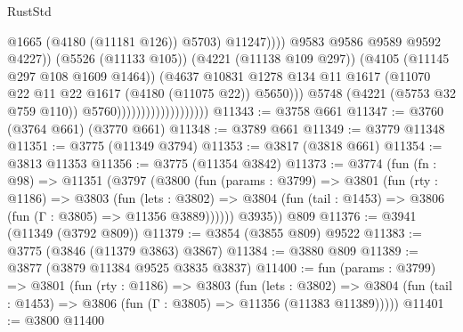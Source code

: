 \begin{lexlean}{RustStd}
\begin{coremodule}
{\begin{coremodule}
{{{{{{{{{{{{{{{{{{{{{{{{{{{{{{{                                                          @1665
                                                          (@4180 (@11181 @126))
                                                          @5703)
                                                        @11247))))
                                                @9583
                                                @9586
                                                @9589
                                                @9592
                                                @4227))
                                            (@5526 (@11133 @105))
                                            (@4221 (@11138 @109 @297))
                                            (@4105 (@11145 @297 @108 @1609 @1464))
                                            (@4637
                                              @10831
                                              @1278
                                              @134
                                              @11
                                              @1617
                                              (@11070
                                                @22
                                                @11
                                                @22
                                                @1617
                                                (@4180 (@11075 @22))
                                                @5650)))
                                          @5748
                                          (@4221 (@5753 @32 @759 @110))
                                          @5760)))))))))))))))))))
@11343 := @3758 @661
@11347 := @3760 (@3764 @661) (@3770 @661)
@11348 := @3789 @661
@11349 := @3779 @11348
@11351 := @3775 (@11349 @3794)
@11353 := @3817 (@3818 @661)
@11354 := @3813 @11353
@11356 := @3775 (@11354 @3842)
@11373 := @3774
    (fun (fn : @98) =>
    @11351
      (@3797
        (@3800
          (fun (params : @3799) =>
          @3801
            (fun (rty : @1186) =>
            @3803
              (fun (lets : @3802) =>
              @3804 (fun (tail : @1453) => @3806 (fun (Γ : @3805) => @11356 @3889))))))
        @3935))
    @809
@11376 := @3941 (@11349 (@3792 @809))
@11379 := @3854 (@3855 @809) @9522
@11383 := @3775 (@3846 (@11379 @3863) @3867)
@11384 := @3880 @809
@11389 := @3877 (@3879 @11384 @9525 @3835 @3837)
@11400 := fun (params : @3799) =>
  @3801
    (fun (rty : @1186) =>
    @3803
      (fun (lets : @3802) =>
      @3804 (fun (tail : @1453) => @3806 (fun (Γ : @3805) => @11356 (@11383 @11389)))))
@11401 := @3800 @11400
}}}}}}}}}}}}}}}}}}}}}}}}}}}}}}}
\end{coremodule}}
\end{coremodule}
\end{lexlean}
